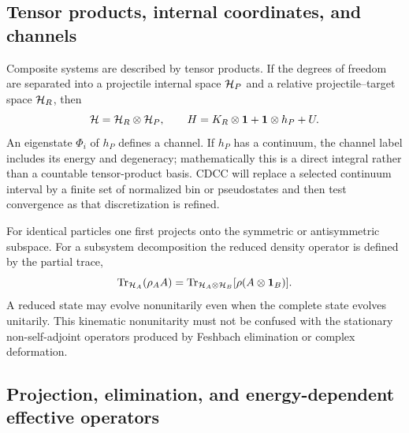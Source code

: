 \subsection{Tensor products, internal coordinates, and channels}
\label{subsec:tensor-products-channels}

Composite systems are described by tensor products.  If the degrees of
freedom are separated into a projectile internal space $\mathcal{H}_P$ and a
relative projectile--target space $\mathcal{H}_R$, then
\begin{equation}
  \mathcal{H}=\mathcal{H}_R\otimes\mathcal{H}_P,
  \qquad
  H=K_R\otimes\mathbf{1}+
     \mathbf{1}\otimes h_P+U.
  \label{eq:projectile-target-tensor}
\end{equation}
An eigenstate $\Phi_i$ of $h_P$ defines a channel.  If $h_P$ has a continuum,
the channel label includes its energy and degeneracy; mathematically this is
a direct integral rather than a countable tensor-product basis.  CDCC will
replace a selected continuum interval by a finite set of normalized bin or
pseudostates and then test convergence as that discretization is refined.

For identical particles one first projects onto the symmetric or
antisymmetric subspace.  For a subsystem decomposition the reduced density
operator is defined by the partial trace,
\begin{equation}
  \operatorname{Tr}_{\mathcal{H}_A}(\rho_A A)
  =\operatorname{Tr}_{\mathcal{H}_A\otimes\mathcal{H}_B}
    [\rho(A\otimes\mathbf{1}_B)].
  \label{eq:partial-trace}
\end{equation}
A reduced state may evolve nonunitarily even when the complete state evolves
unitarily.  This kinematic nonunitarity must not be confused with the
stationary non-self-adjoint operators produced by Feshbach elimination or
complex deformation.

\subsection{Projection, elimination, and energy-dependent effective operators}
\label{subsec:projection-preview}

